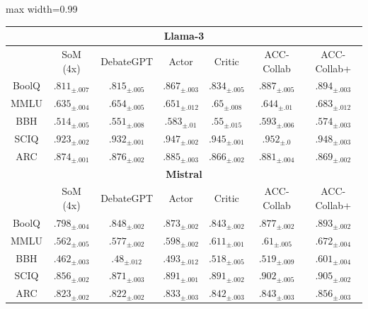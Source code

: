 \begin{table}[tbh]
    \centering
\begin{adjustbox}{max width=0.99\textwidth}
    \begin{tabular}{c|c|c||c|c||c|c}
\multicolumn{7}{c}{\textbf{Llama-3}}\\
\hline
& SoM (4x) & DebateGPT & Actor & Critic & ACC-Collab & ACC-Collab+\\
BoolQ & $.811_{\pm.007}$ & $.815_{\pm.005}$ & $.867_{\pm.003}$ & $.834_{\pm.005}$ & $.887_{\pm.005}$ & $\mathbf{.894}_{\pm.003}$\\ 
MMLU & $.635_{\pm.004}$ & $.654_{\pm.005}$ & $.651_{\pm.012}$ & $.65_{\pm.008}$ & $.644_{\pm.01}$ & $\mathbf{.683}_{\pm.012}$\\ 
BBH & $.514_{\pm.005}$ & $.551_{\pm.008}$ & $.583_{\pm.01}$ & $.55_{\pm.015}$ & $\mathbf{.593}_{\pm.006}$ & $.574_{\pm.003}$\\ 
SCIQ & $.923_{\pm.002}$ & $.932_{\pm.001}$ & $.947_{\pm.002}$ & $.945_{\pm.001}$ & $\mathbf{.952}_{\pm.0}$ & $.948_{\pm.003}$\\ 
ARC & $.874_{\pm.001}$ & $.876_{\pm.002}$ & $\mathbf{.885}_{\pm.003}$ & $.866_{\pm.002}$ & $.881_{\pm.004}$ & $.869_{\pm.002}$\\ 


\multicolumn{7}{c}{\textbf{Mistral}}\\
\hline
& SoM (4x) & DebateGPT & Actor & Critic & ACC-Collab & ACC-Collab+\\
BoolQ & $.798_{\pm.004}$ & $.848_{\pm.002}$ & $.873_{\pm.002}$ & $.843_{\pm.002}$ & $.877_{\pm.002}$ & $\mathbf{.893}_{\pm.002}$\\ 
MMLU & $.562_{\pm.005}$ & $.577_{\pm.002}$ & $.598_{\pm.002}$ & $.611_{\pm.001}$ & $.61_{\pm.005}$ & $\mathbf{.672}_{\pm.004}$\\ 
BBH & $.462_{\pm.003}$ & $.48_{\pm.012}$ & $.493_{\pm.012}$ & $.518_{\pm.005}$ & $.519_{\pm.009}$ & $\mathbf{.601}_{\pm.004}$\\ 
SCIQ & $.856_{\pm.002}$ & $.871_{\pm.003}$ & $.891_{\pm.001}$ & $.891_{\pm.002}$ & $.902_{\pm.005}$ & $\mathbf{.905}_{\pm.002}$\\ 
ARC & $.823_{\pm.002}$ & $.822_{\pm.002}$ & $.833_{\pm.003}$ & $.842_{\pm.003}$ & $.843_{\pm.003}$ & $\mathbf{.856}_{\pm.003}$\\ 



\end{tabular}
\end{adjustbox}
\end{table}

